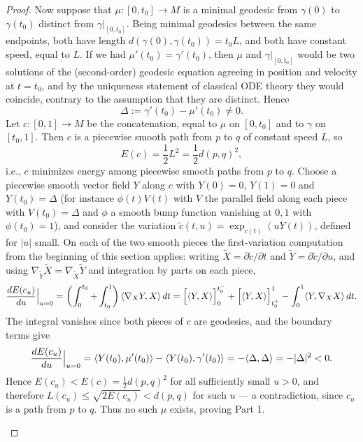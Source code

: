 \begin{proof}
Now suppose that $\mu\colon [0,t_0]\to M$ is a minimal geodesic from
$\gamma(0)$ to $\gamma(t_0)$ distinct from $\gamma|_{[0,t_0]}$. Being
minimal geodesics between the same endpoints, both have length
$d(\gamma(0),\gamma(t_0))=t_0L$, and both have constant speed, equal
to $L$. If we had $\mu'(t_0)=\gamma'(t_0)$, then $\mu$ and
$\gamma|_{[0,t_0]}$ would be two solutions of the (second-order)
geodesic equation agreeing in position and velocity at $t=t_0$, and
by the uniqueness statement of classical ODE theory they would
coincide, contrary to the assumption that they are distinct. Hence
$$\Delta:=\gamma'(t_0)-\mu'(t_0)\not=0.$$
Let $c\colon [0,1]\to M$ be the concatenation, equal to $\mu$ on
$[0,t_0]$ and to $\gamma$ on $[t_0,1]$. Then $c$ is a piecewise
smooth path from $p$ to $q$ of constant speed $L$, so
$$E(c)=\frac{1}{2}L^2=\frac{1}{2}d(p,q)^2,$$
i.e., $c$ minimizes energy among piecewise smooth paths from $p$ to
$q$. Choose a piecewise smooth vector field $Y$ along $c$ with
$Y(0)=0$, $Y(1)=0$ and $Y(t_0)=\Delta$ (for instance $\phi(t)V(t)$
with $V$ the parallel field along each piece with
$V(t_0)=\Delta$ and $\phi$ a smooth bump function vanishing at $0,1$
with $\phi(t_0)=1$), and consider the variation
$\tilde c(t,u)=\exp_{c(t)}(uY(t))$, defined for $|u|$ small. On each
of the two smooth pieces the first-variation computation from the
beginning of this section applies: writing $\widetilde X=\partial
\tilde c/\partial t$ and $\widetilde Y=\partial\tilde c/\partial u$,
and using $\nabla_{\widetilde Y}\widetilde X=\nabla_{\widetilde
X}\widetilde Y$ and integration by parts on each piece,
$$\frac{dE(c_u)}{du}\Bigl|_{u=0}\Bigr.
=\left(\int_0^{t_0}+\int_{t_0}^1\right)
\langle\nabla_{X}Y,X\rangle\,dt
=\Bigl[\langle Y,X\rangle\Bigr]_0^{t_0^-}
+\Bigl[\langle Y,X\rangle\Bigr]_{t_0^+}^{1}
-\int_0^1\langle Y,\nabla_XX\rangle\,dt.$$
The integral vanishes since both pieces of $c$ are geodesics, and
the boundary terms give
$$\frac{dE(c_u)}{du}\Bigl|_{u=0}\Bigr.
=\langle Y(t_0),\mu'(t_0)\rangle-\langle
Y(t_0),\gamma'(t_0)\rangle=-\langle \Delta,\Delta\rangle
=-|\Delta|^2<0.$$
Hence $E(c_u)<E(c)=\frac{1}{2}d(p,q)^2$ for all sufficiently small
$u>0$, and therefore $L(c_u)\le\sqrt{2E(c_u)}<d(p,q)$ for such $u$
--- a contradiction, since $c_u$ is a path from $p$ to $q$. Thus no
such $\mu$ exists, proving Part 1.

\begin{remark}
\label{rem:part1-corner-rigidity-route}
\leanok


\end{remark}
\end{proof}
